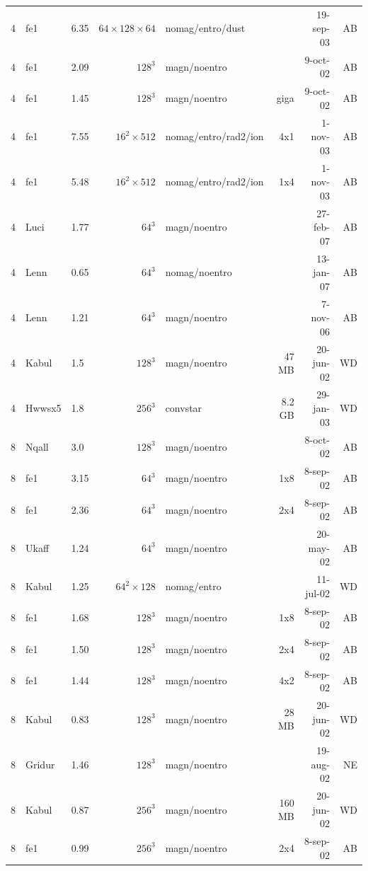 \documentclass[\mydriver,12pt,twoside,notitlepage,a4paper]{article}
\begin{document}
\begin{center}
\begin{footnotesize}
\begin{longtable}{rllrlrrr}
   4 & fe1   & 6.35 &  $64{\!\times\!}128{\!\times\!}64$
                              & nomag/entro/dust &    & 19-sep-03 & AB \\
   4 & fe1   & 2.09 & $128^3$ & magn/noentro &        &  9-oct-02 & AB \\
   4 & fe1   & 1.45 & $128^3$ & magn/noentro & giga   &  9-oct-02 & AB \\
   4 & fe1   & 7.55 & $16^2{\!\times\!}512$
                     & nomag/entro/rad2/ion &  4x1   &  1-nov-03 & AB \\
   4 & fe1   & 5.48 & $16^2{\!\times\!}512$
                     & nomag/entro/rad2/ion &  1x4   &  1-nov-03 & AB \\
   4 & Luci  & 1.77 &  $64^3$ & magn/noentro &        & 27-feb-07 & AB \\
   4 & Lenn  & 0.65 &  $64^3$ &nomag/noentro &        & 13-jan-07 & AB \\
   4 & Lenn  & 1.21 &  $64^3$ & magn/noentro &        &  7-nov-06 & AB \\
   4 & Kabul & 1.5  & $128^3$ & magn/noentro &  47 MB & 20-jun-02 & WD \\
   4 & Hwwsx5& 1.8  & $256^3$ & convstar     & 8.2 GB & 29-jan-03 & WD \\
   8 & Nqall & 3.0  & $128^3$ & magn/noentro &        &  8-oct-02 & AB \\
   8 & fe1   & 3.15 &  $64^3$ & magn/noentro &  1x8   &  8-sep-02 & AB \\
   8 & fe1   & 2.36 &  $64^3$ & magn/noentro &  2x4   &  8-sep-02 & AB \\
   8 & Ukaff & 1.24 &  $64^3$ & magn/noentro &        & 20-may-02 & AB \\
   8 & Kabul & 1.25 & $64^2{\!\times\!}128$
                              & nomag/entro &        & 11-jul-02 & WD \\
   8 & fe1   & 1.68 & $128^3$ & magn/noentro &  1x8   &  8-sep-02 & AB \\
   8 & fe1   & 1.50 & $128^3$ & magn/noentro &  2x4   &  8-sep-02 & AB \\
   8 & fe1   & 1.44 & $128^3$ & magn/noentro &  4x2   &  8-sep-02 & AB \\
   8 & Kabul & 0.83 & $128^3$ & magn/noentro &  28 MB & 20-jun-02 & WD \\
   8 & Gridur& 1.46 & $128^3$ & magn/noentro &        & 19-aug-02 & NE \\
   8 & Kabul & 0.87 & $256^3$ & magn/noentro & 160 MB & 20-jun-02 & WD \\
   8 & fe1   & 0.99 & $256^3$ & magn/noentro &  2x4   &  8-sep-02 & AB \\

\end{longtable}
\end{footnotesize}
\end{center}
\end{document}
